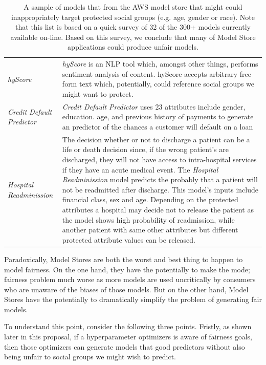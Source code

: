 \begin{table}
\small
\begin{tabular}{|p{0.8in}|p{5.4in}|}\hline
\rowcolor{gray!20}
 {\em hyScore} & {\em hyScore} is an NLP tool which, amongst other things, performs  sentiment analysis of content. hyScore accepts arbitrary free form text which, potentially, could reference   social groups we might want to protect.
 \\ 
 {\em  Credit Default Predictor} &{\em Credit Default Predictor} uses   23 attributes include gender, education. age, and previous history of payments to generate an   predictor of the chances a customer will default on a loan
 \\
\rowcolor{gray!20}
{\em Hospital Readminission} &
The decision whether or not to discharge a patient can be a life or
death decision since, if the wrong patient's are discharged, they
will not have access to   intra-hospital services if they have an acute medical event. The {\em Hospital Readminission} model predicts the probably that a patient will not be readmitted after discharge. This model's inputs include financial class, sex and age. Depending on the protected attributes a hospital may decide not to release the patient as the model shows high probability of readmission, while another patient with same other attributes but different protected attribute values can be released.
\\
\hline
\end{tabular}
\caption{A sample of models that from the AWS model store
that might  could inappropriately target protected social groups (e.g. age, gender or race). Note that this list is based on a quick survey
of 32 of the 300+ models currently available on-line.
Based on this survey, we conclude that many of Model Store
applications could produce unfair models.}
\label{tbl:msample}
\end{table}


Paradoxically,   Model Stores are both the worst and best thing to happen to model fairness. On the one hand, they have the potentially to make the mode; fairness problem much worse as more models are used uncritically
by consumers who are unaware of the biases of those models.
But on the other hand, Model Stores have the potentially to dramatically simplify the problem of generating fair models. 

To understand this point, consider the following three points.
Fristly, as shown later in this proposal, if a hyperparameter optimizers
is aware of fairness goals, then those optimizers can generate models
that good predictors without also being unfair to social groups we might wish to predict.

